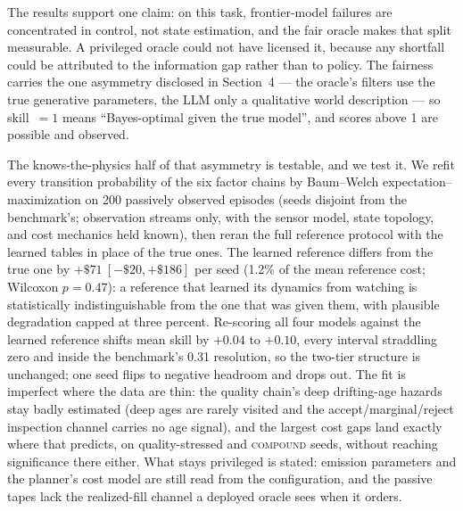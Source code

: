 \documentclass{article}
\begin{document}
The results support one claim: on this task, frontier-model failures are
concentrated in control, not state estimation, and the fair oracle makes that
split measurable. A privileged oracle could not have licensed it, because any
shortfall could be attributed to the information gap rather than to policy.
The fairness carries the one asymmetry disclosed in Section~4 --- the
oracle's filters use the true generative parameters, the LLM only a
qualitative world description --- so skill~$=1$ means ``Bayes-optimal
given the true model'', and scores above 1 are possible and observed.

The knows-the-physics half of that asymmetry is testable, and we test it.
We refit every transition probability of the six factor chains by
Baum--Welch expectation--maximization \citep{rabiner1989hmm} on 200
passively observed episodes (seeds disjoint from the benchmark's;
observation streams only, with the sensor model, state topology, and cost
mechanics held known), then reran the full reference protocol with the
learned tables in place of the true ones. The learned reference differs
from the true one by $+\$71\ [-\$20, +\$186]$ per seed (1.2\% of the mean
reference cost; Wilcoxon $p = 0.47$): a reference that learned its
dynamics from watching is statistically indistinguishable from the one
that was given them, with plausible degradation capped at three percent.
Re-scoring all four models against the learned reference shifts mean
skill by $+0.04$ to $+0.10$, every interval straddling zero and inside
the benchmark's 0.31 resolution, so the two-tier structure is unchanged;
one seed flips to negative headroom and drops out. The fit is imperfect
where the data are thin: the quality chain's deep drifting-age hazards
stay badly estimated (deep ages are rarely visited and the
accept/marginal/reject inspection channel carries no age signal), and the
largest cost gaps land exactly where that predicts, on quality-stressed
and \textsc{compound} seeds, without reaching significance there either.
What stays privileged is stated: emission parameters and the planner's
cost model are still read from the configuration, and the passive tapes
lack the realized-fill channel a deployed oracle sees when it orders.
\end{document}
